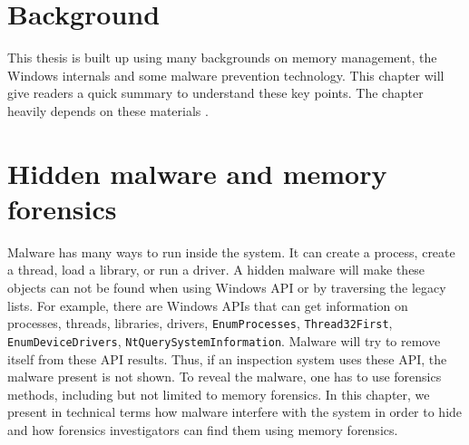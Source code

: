 \chapter[Background]{Background}

This thesis is built up using many backgrounds on memory management, the
Windows internals and some malware prevention technology. This chapter will
give readers a quick summary to understand these key points. The chapter
heavily depends on these materials \cite{ligh2014art}
\cite{russinovich2012windows}.





\chapter[Hidden malware and memory forensics]{Hidden malware and memory forensics}

Malware has many ways to run inside the system. It can create a process, create
a thread, load a library, or run a driver. A hidden malware will make these
objects can not be found when using Windows API or by traversing the legacy
lists.  For example, there are Windows APIs that can get information on
processes, threads, libraries, drivers, \texttt{EnumProcesses},
\texttt{Thread32First}, \texttt{EnumDeviceDrivers},
\texttt{NtQuerySystemInformation}. Malware will try to remove itself from these
API results. Thus, if an inspection system uses these API, the malware present
is not shown. To reveal the malware, one has to use forensics methods,
including but not limited to memory forensics.  In this chapter, we present in
technical terms how malware interfere with the system in order to hide and how
forensics investigators can find them using memory forensics.



